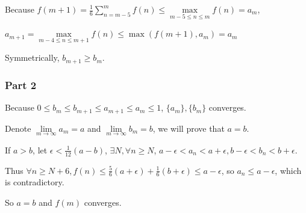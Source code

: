 \documentclass{article}
\begin{document}
Because $f(m+1) = \frac 1 6 \sum\limits_{n = m-5}^{m} f(n) \leqslant \max\limits_{m-5 \leqslant n\leqslant m}f(n) = a_m$, 

$a_{m+1} = \max\limits_{m-4 \leqslant n\leqslant m+1}f(n) \leqslant \max (f(m+1),a_m) = a_m$

Symmetrically, $b_{m+1} \geqslant b_m$.

\subsubsection*{Part 2}

Because $0\leqslant b_m\leqslant b_{m+1} \leqslant a_{m+1} \leqslant a_m \leqslant 1$, $\{a_m\},\{b_m\}$ converges. 

Denote $\lim\limits_{m\to\infty} a_m = a$ and $\lim\limits_{m\to\infty} b_m = b$,  we will prove that $a=b$.

If $a>b$, let $\epsilon < \frac 1 {12}(a-b)$,  $\exists N,\forall n \geqslant N$, $a-\epsilon <a_n < a+ \epsilon,b-\epsilon <b_n < b+ \epsilon $.

Thus $\forall n \geqslant N+6, f(n) \leqslant \frac 5 6 (a+ \epsilon) + \frac 1 6 ( b+ \epsilon)\leqslant a-\epsilon$, so $a_n \leqslant a-\epsilon$, which is contradictory.

So $a=b$ and $f(m)$ converges.
\end{document}
